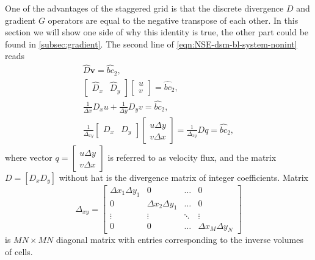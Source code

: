 \documentclass{article}
\numberwithin{equation}{section}
\begin{document}
One of the advantages of the staggered grid is that the discrete divergence $D$ and gradient $G$ operators are equal to the negative transpose of each other. 
In this section we will show one side of why this identity is true, the other part could be found in \cref{subsec:gradient}.
The second line of \cref{eqn:NSE-dsm-bl-system-nonint} reads
\begin{equation*}
\begin{gathered}
\hat{D}\boldsymbol{v}=\hat{bc}_2,\\
\left[ 
\begin{array}{ll}
\hat{D}_x & \hat{D}_y 	
\end{array}
\right]\left[\begin{array}{l}
u\\
v
\end{array}
\right]=\hat{bc}_2
, \\
\frac{1}{\Delta x} D_x u+\frac{1}{\Delta y} D_y v=\hat{bc}_2, \\
\frac{1}{\Delta _{xy}}\left[\begin{array}{ll}
D_x & D_y
\end{array}\right]\left[\begin{array}{l}
u \Delta y \\
v \Delta x
\end{array}\right]=\frac{1}{\Delta _{xy}} D q=\hat{bc}_2,
\end{gathered}
\end{equation*}
where vector $q=\left[\begin{array}{l}
u \Delta y \\
v \Delta x
\end{array}\right]$ is referred to as velocity flux, and the matrix $D=[D_x D_y]$ without hat is the divergence matrix of integer coefficients. Matrix
\begin{equation}\label{eqn:delta-xy}
	\Delta _{xy}=
	\begin{bmatrix}{}
		{\Delta x_1\Delta y_1}		&0	&\dots	&0\\
		0		&{\Delta x_2\Delta y_1}	&\dots	&0\\
		\vdots		&\vdots	&\ddots	&\vdots\\
		0		&0	&\dots	&{\Delta x_M\Delta y_N}
	\end{bmatrix}
\end{equation}
is $MN\times MN$ diagonal matrix with entries corresponding to the inverse volumes of cells. 
\end{document}
